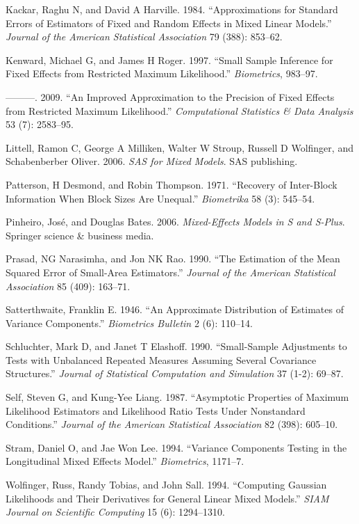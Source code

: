 \documentclass{article}
\begin{document}
\leavevmode\hypertarget{ref-kackar1984approximations}{}%
Kackar, Raghu N, and David A Harville. 1984. ``Approximations for
Standard Errors of Estimators of Fixed and Random Effects in Mixed
Linear Models.'' \emph{Journal of the American Statistical Association}
79 (388): 853--62.

\leavevmode\hypertarget{ref-kenward1997small}{}%
Kenward, Michael G, and James H Roger. 1997. ``Small Sample Inference
for Fixed Effects from Restricted Maximum Likelihood.''
\emph{Biometrics}, 983--97.

\leavevmode\hypertarget{ref-kenward2009improved}{}%
---------. 2009. ``An Improved Approximation to the Precision of Fixed
Effects from Restricted Maximum Likelihood.'' \emph{Computational
Statistics \& Data Analysis} 53 (7): 2583--95.

\leavevmode\hypertarget{ref-littell2006sas}{}%
Littell, Ramon C, George A Milliken, Walter W Stroup, Russell D
Wolfinger, and Schabenberber Oliver. 2006. \emph{SAS for Mixed Models}.
SAS publishing.

\leavevmode\hypertarget{ref-patterson1971recovery}{}%
Patterson, H Desmond, and Robin Thompson. 1971. ``Recovery of
Inter-Block Information When Block Sizes Are Unequal.''
\emph{Biometrika} 58 (3): 545--54.

\leavevmode\hypertarget{ref-pinheiro2006mixed}{}%
Pinheiro, José, and Douglas Bates. 2006. \emph{Mixed-Effects Models in S
and S-Plus}. Springer science \& business media.

\leavevmode\hypertarget{ref-prasad1990estimation}{}%
Prasad, NG Narasimha, and Jon NK Rao. 1990. ``The Estimation of the Mean
Squared Error of Small-Area Estimators.'' \emph{Journal of the American
Statistical Association} 85 (409): 163--71.

\leavevmode\hypertarget{ref-satterthwaite1946approximate}{}%
Satterthwaite, Franklin E. 1946. ``An Approximate Distribution of
Estimates of Variance Components.'' \emph{Biometrics Bulletin} 2 (6):
110--14.

\leavevmode\hypertarget{ref-schluchter1990small}{}%
Schluchter, Mark D, and Janet T Elashoff. 1990. ``Small-Sample
Adjustments to Tests with Unbalanced Repeated Measures Assuming Several
Covariance Structures.'' \emph{Journal of Statistical Computation and
Simulation} 37 (1-2): 69--87.

\leavevmode\hypertarget{ref-self1987asymptotic}{}%
Self, Steven G, and Kung-Yee Liang. 1987. ``Asymptotic Properties of
Maximum Likelihood Estimators and Likelihood Ratio Tests Under
Nonstandard Conditions.'' \emph{Journal of the American Statistical
Association} 82 (398): 605--10.

\leavevmode\hypertarget{ref-stram1994variance}{}%
Stram, Daniel O, and Jae Won Lee. 1994. ``Variance Components Testing in
the Longitudinal Mixed Effects Model.'' \emph{Biometrics}, 1171--7.

\leavevmode\hypertarget{ref-wolfinger1994computing}{}%
Wolfinger, Russ, Randy Tobias, and John Sall. 1994. ``Computing Gaussian
Likelihoods and Their Derivatives for General Linear Mixed Models.''
\emph{SIAM Journal on Scientific Computing} 15 (6): 1294--1310.



\end{document}
